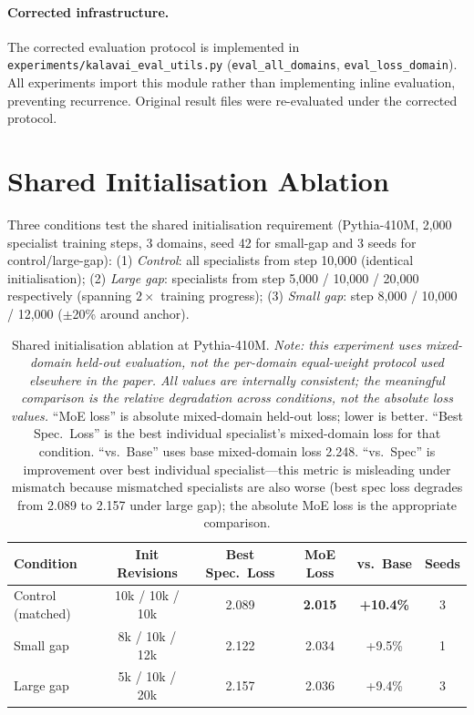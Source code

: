 \documentclass{article}
\begin{document}
\paragraph{Corrected infrastructure.} The corrected evaluation protocol is implemented in \texttt{experiments/kalavai\_eval\_utils.py} (\texttt{eval\_all\_domains}, \texttt{eval\_loss\_domain}). All experiments import this module rather than implementing inline evaluation, preventing recurrence. Original result files were re-evaluated under the corrected protocol.

\section{Shared Initialisation Ablation}
\label{app:sharedinit}

Three conditions test the shared initialisation requirement (Pythia-410M, 2,000 specialist training steps, 3 domains, seed 42 for small-gap and 3 seeds for control/large-gap): (1) \emph{Control}: all specialists from step 10,000 (identical initialisation); (2) \emph{Large gap}: specialists from step 5,000 / 10,000 / 20,000 respectively (spanning $2\times$ training progress); (3) \emph{Small gap}: step 8,000 / 10,000 / 12,000 ($\pm$20\% around anchor).

\begin{table}[h]
\centering
\caption{Shared initialisation ablation at Pythia-410M. \emph{Note: this experiment uses mixed-domain held-out evaluation, not the per-domain equal-weight protocol used elsewhere in the paper. All values are internally consistent; the meaningful comparison is the relative degradation across conditions, not the absolute loss values.} ``MoE loss'' is absolute mixed-domain held-out loss; lower is better. ``Best Spec.\ Loss'' is the best individual specialist's mixed-domain loss for that condition. ``vs.\ Base'' uses base mixed-domain loss 2.248. ``vs.\ Spec'' is improvement over best individual specialist---this metric is misleading under mismatch because mismatched specialists are also worse (best spec loss degrades from 2.089 to 2.157 under large gap); the absolute MoE loss is the appropriate comparison.}
\label{tab:sharedinit}
\begin{tabular}{lccccc}
\toprule
\textbf{Condition} & \textbf{Init Revisions} & \textbf{Best Spec.\ Loss} & \textbf{MoE Loss} & \textbf{vs.\ Base} & \textbf{Seeds} \\
\midrule
Control (matched)  & 10k / 10k / 10k         & 2.089          & \textbf{2.015} & \textbf{+10.4\%} & 3 \\
Small gap          & 8k / 10k / 12k          & 2.122          & 2.034          & +9.5\%           & 1 \\
Large gap          & 5k / 10k / 20k          & 2.157          & 2.036          & +9.4\%           & 3 \\
\bottomrule
\end{tabular}
\end{table}
\end{document}
